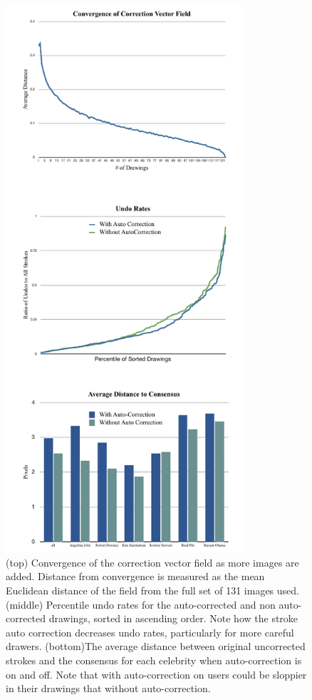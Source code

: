 \begin{figure}
  \centering%
\includegraphics[width=3.5in]{./figures/userstudy/threeGraphs.pdf}
  \caption{(top) Convergence of the correction vector field as more images are added. Distance from convergence is measured as the mean Euclidean distance of the field from the full set of 131 images used.  (middle) Percentile undo rates for the auto-corrected and non auto-corrected drawings, sorted in ascending order. Note how the stroke auto correction decreases undo rates, particularly for more careful drawers. (bottom)The average distance between original uncorrected strokes and the consensus for each celebrity when auto-correction is on and off. Note that with auto-correction on users could be sloppier in their drawings that without auto-correction.}
  \label{fig:daf-three}
\end{figure}

